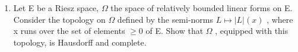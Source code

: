 \begin{enumerate}
\def\labelenumi{\arabic{enumi})}
\setcounter{enumi}{8}
\tightlist
\item
  Let E be a Riesz space, \(\Omega\) the space of relatively bounded linear forms on E. Consider the topology on \(\Omega\) defined by the semi-norms \(L \mapsto |L|(x)\) , where x runs over the set of elements \(\geqslant 0\) of E. Show that \(\Omega\) , equipped with this topology, is Hausdorff and complete.
\end{enumerate}

